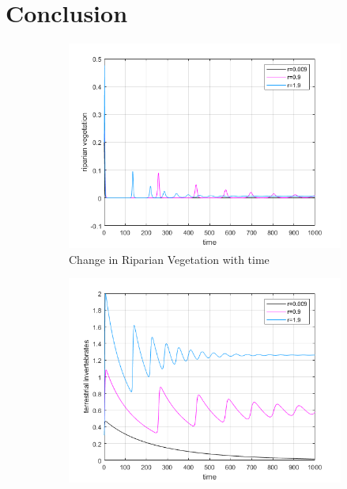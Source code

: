 \documentclass[12pt]{article}
\numberwithin{equation}{section}
\begin{document}
\section{Conclusion}
\begin{figure}[bp!]
	\centering
        \caption{Variation in parameter r}
	\begin{subfigure}[t]{0.45\textwidth}
		\centering
	\includegraphics[width=\textwidth]{time_vs_riparian_r.png}
		\caption{Change in Riparian Vegetation with time} \label{fig:time_vs_riparian_r}
	\end{subfigure}
\hspace{0.08\textwidth}
        \begin{subfigure}[t]{0.45\textwidth}
                 \centering
         \includegraphics[width=\textwidth]{time_vs_invertebrates_r.png}

\end{subfigure}
\end{figure}
\end{document}
